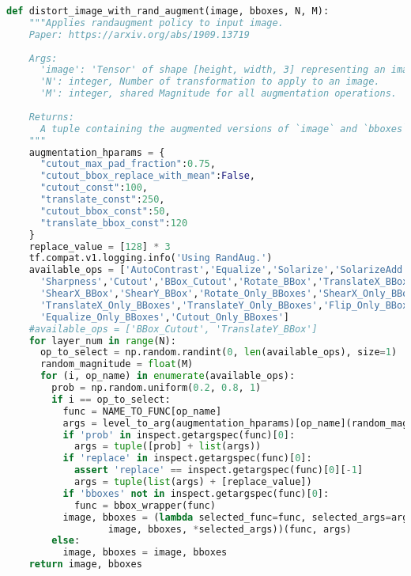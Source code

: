 \begin{lstlisting}[caption={Funzione per implementare RandAugment}, language=Python, basicstyle=\tiny,label=code:rand_augment_function]
    def distort_image_with_rand_augment(image, bboxes, N, M):
    """Applies randaugment policy to input image.
    Paper: https://arxiv.org/abs/1909.13719
    
    Args:
      'image': 'Tensor' of shape [height, width, 3] representing an image.
      'N': integer, Number of transformation to apply to an image.
      'M': integer, shared Magnitude for all augmentation operations.
    
    Returns:
      A tuple containing the augmented versions of `image` and `bboxes`.
    """
    augmentation_hparams = {
      "cutout_max_pad_fraction":0.75,
      "cutout_bbox_replace_with_mean":False,
      "cutout_const":100,
      "translate_const":250,
      "cutout_bbox_const":50,
      "translate_bbox_const":120
    }
    replace_value = [128] * 3 
    tf.compat.v1.logging.info('Using RandAug.')
    available_ops = ['AutoContrast','Equalize','Solarize','SolarizeAdd','Contrast','Brightness',
      'Sharpness','Cutout','BBox_Cutout','Rotate_BBox','TranslateX_BBox','TranslateY_BBox',
      'ShearX_BBox','ShearY_BBox','Rotate_Only_BBoxes','ShearX_Only_BBoxes','ShearY_Only_BBoxes',
      'TranslateX_Only_BBoxes','TranslateY_Only_BBoxes','Flip_Only_BBoxes','Solarize_Only_BBoxes',
      'Equalize_Only_BBoxes','Cutout_Only_BBoxes']
    #available_ops = ['BBox_Cutout', 'TranslateY_BBox']
    for layer_num in range(N):
      op_to_select = np.random.randint(0, len(available_ops), size=1)
      random_magnitude = float(M) 
      for (i, op_name) in enumerate(available_ops): 
        prob = np.random.uniform(0.2, 0.8, 1) 
        if i == op_to_select:
          func = NAME_TO_FUNC[op_name]
          args = level_to_arg(augmentation_hparams)[op_name](random_magnitude)
          if 'prob' in inspect.getargspec(func)[0]:
            args = tuple([prob] + list(args))
          if 'replace' in inspect.getargspec(func)[0]:
            assert 'replace' == inspect.getargspec(func)[0][-1]
            args = tuple(list(args) + [replace_value])
          if 'bboxes' not in inspect.getargspec(func)[0]:
            func = bbox_wrapper(func)
          image, bboxes = (lambda selected_func=func, selected_args=args: selected_func(
                  image, bboxes, *selected_args))(func, args)
        else:
          image, bboxes = image, bboxes
    return image, bboxes
  
\end{lstlisting}
